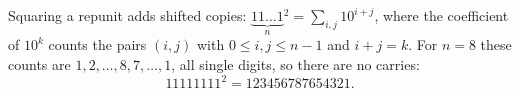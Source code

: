 Squaring a repunit adds shifted copies: $\underbrace{11\ldots1}_n{}^2=\sum_{i,j}10^{i+j}$, where the coefficient of $10^k$ counts the pairs $(i,j)$ with $0\le i,j\le n-1$ and $i+j=k$. For $n=8$ these counts are $1,2,\dots,8,7,\dots,1$, all single digits, so there are no carries:
\[
11111111^2=\boxed{123456787654321}.
\]
